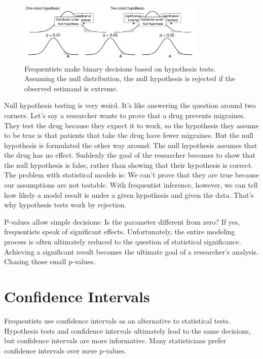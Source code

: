 \documentclass[
  10pt,
]{scrbook}
\begin{document}
\begin{figure}

{\centering \includegraphics[width=0.8\textwidth]{figures/hypothesis-1} 

}

\caption{Frequentists make binary decisions based on hypothesis tests. Assuming the null distribution, the null hypothesis is rejected if the observed estimand is extreme.}\label{fig:hypothesis}
\end{figure}

Null hypothesis testing is very weird.
It's like answering the question around two corners.
Let's say a researcher wants to prove that a drug prevents migraines.
They test the drug because they expect it to work, so the hypothesis they assume to be true is that patients that take the drug have fewer migraines.
But the null hypothesis is formulated the other way around:
The null hypothesis assumes that the drug has no effect.
Suddenly the goal of the researcher becomes to show that the null hypothesis is false, rather than showing that their hypothesis is correct.
The problem with statistical models is: We can't prove that they are true because our assumptions are not testable.
With frequentist inference, however, we can tell how likely a model result is under a given hypothesis and given the data.
That's why hypothesis tests work by rejection.

P-values allow simple decisions: Is the parameter different from zero?
If yes, frequentists speak of significant effects.
Unfortunately, the entire modeling process is often ultimately reduced to the question of statistical significance.
Achieving a significant result becomes the ultimate goal of a researcher's analysis.
Chasing those small p-values.

\hypertarget{confidence-intervals}{%
\section{Confidence Intervals}\label{confidence-intervals}}

Frequentists use confidence intervals as an alternative to statistical tests.
Hypothesis tests and confidence intervals ultimately lead to the same decisions, but confidence intervals are more informative.
Many statisticians prefer confidence intervals over mere p-values.
\end{document}
